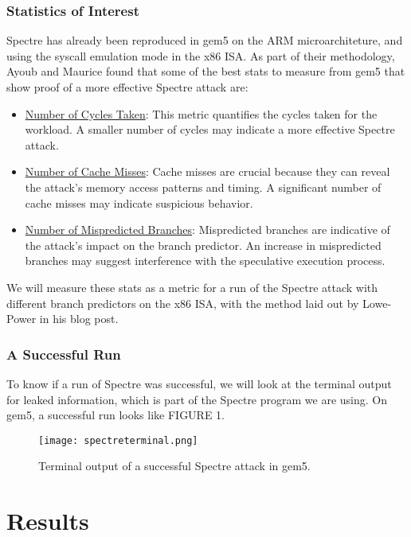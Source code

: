 \documentclass[twocolumn,showpacs,%
  nofootinbib,aps,superscriptaddress,%
  eqsecnum,prd,notitlepage,showkeys,10pt]{revtex4-1}
\begin{document}
\subsubsection{Statistics of Interest}

Spectre has already been reproduced in gem5 on the ARM microarchiteture\cite{10.1145/3447852.3458715}, and using the syscall emulation mode in the x86 ISA\cite{jasonspectre}. As part of their methodology, Ayoub and Maurice found that some of the best stats to measure from gem5 that show proof of a more effective Spectre attack are:

\begin{itemize}
  \item \underline{Number of Cycles Taken}: This metric quantifies the cycles taken for the workload. A smaller number of cycles may indicate a more effective Spectre attack.
  \item \underline{Number of Cache Misses}: Cache misses are crucial because they can reveal the attack's memory access patterns and timing. A significant number of cache misses may indicate suspicious behavior.
  \item \underline{Number of Mispredicted Branches}: Mispredicted branches are indicative of the attack's impact on the branch predictor. An increase in mispredicted branches may suggest interference with the speculative execution process.
\end{itemize}

We will measure these stats as a metric for a run of the Spectre attack\cite{SPECTREPRog} with different branch predictors on the x86 ISA, with the method laid out by Lowe-Power in his blog post\cite{jasonspectre}.

\subsubsection{A Successful Run}

To know if a run of Spectre was successful, we will look at the terminal output for leaked information, which is part of the Spectre program we are using. On gem5, a successful run looks like FIGURE 1.

\begin{figure}
    \centering
    \texttt{[image: spectreterminal.png]}
    \caption{Terminal output of a successful Spectre attack in gem5.}
\end{figure}

\section{Results}
\end{document}
